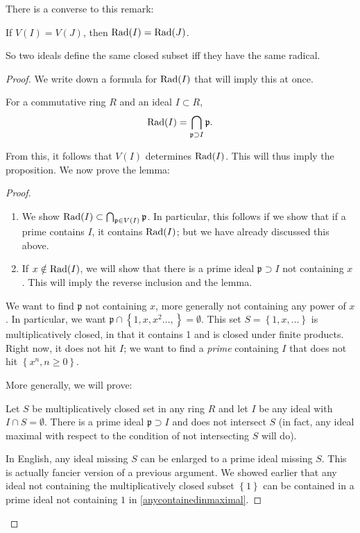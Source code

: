 There is a converse to this remark:
\begin{proposition} 
If $V(I) = V(J)$, then $\operatorname{Rad}(I) = \operatorname{Rad}(J)$. 
\end{proposition} 
So two ideals define the same closed subset iff they have the
same radical.
\begin{proof} 
We write down a formula for $\operatorname{Rad}(I)$ that will imply this at
once.
\begin{lemma} \label{radprimescontaining} For a commutative ring $R$ and an ideal $I \subset
R$,
\[ \operatorname{Rad}(I) = \bigcap_{\mathfrak{p} \supset I} \mathfrak{p}.  \]
\end{lemma} 
From this, it follows that $V(I)$ determines $\operatorname{Rad}(I)$. This
will thus imply
the proposition.  
We now prove the lemma:
\begin{proof} 
\begin{enumerate}
\item We show $\operatorname{Rad}(I) \subset \bigcap_{\mathfrak{p} \in V(I)}
\mathfrak{p} $. In
particular, this follows if we show that if a prime contains
$I$, it contains $\operatorname{Rad}(I)$; but we have already
discussed this above.  
\item If $x \notin \operatorname{Rad}(I)$, we will show that there is a prime
ideal $\mathfrak{p}
\supset I$ not containing $x$. This will imply the reverse
inclusion and the
lemma.  
\end{enumerate}


We want to find $\mathfrak{p}$ not containing $x$, more
generally not
containing any power of $x$. In particular, we want
$\mathfrak{p} \cap \left\{1,
x, x^2 \dots, \right\} = \emptyset$. This set $S = \left\{1, x,
\dots\right\}$
is multiplicatively closed, in that it contains 1 and is closed
under
finite products. Right now, it does not hit $I$; we want to find
a
\emph{prime} containing $I$ that does not hit $\left\{x^n, n
\geq 0\right\}$.


More generally, we will prove:

\begin{sublemma}\label{sublemmamultclosed}
Let $S$ be multiplicatively closed set in any ring $R$ and let
$I$ be any ideal with $I \cap S =
\emptyset$. There is a prime ideal $\mathfrak{p} \supset I$ and
does not
intersect $S$ (in fact, any ideal maximal with respect to the condition of
not intersecting $S$ will do).  
\end{sublemma}
In English, any ideal missing $S$ can be enlarged to a prime
ideal missing $S$.
This is actually fancier version of a previous argument. We
showed earlier that any ideal not
containing the multiplicatively closed subset $\left\{1\right\}$
can be
contained in a prime ideal not containing $1$ in
\ref{anycontainedinmaximal}.


\end{proof}
\end{proof}
